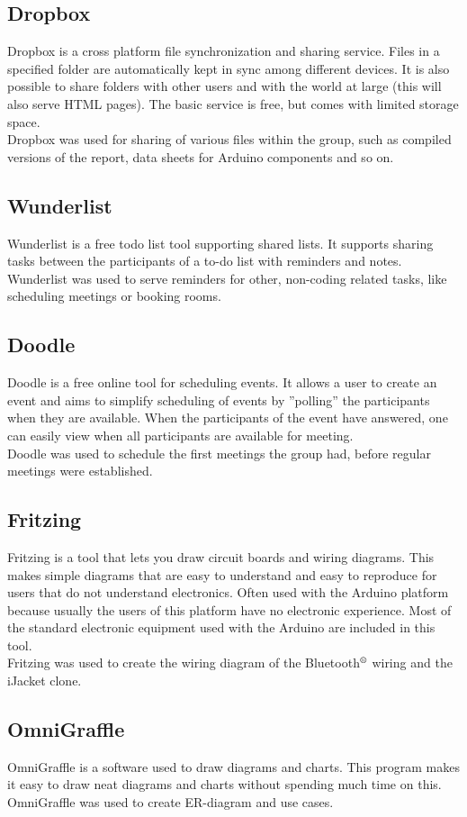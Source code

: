 \subsection{Dropbox}
Dropbox is a cross platform file synchronization and sharing service. Files in a specified folder are automatically kept in sync among different devices. It is also possible to share folders with other users and with the world at large (this will also serve HTML pages). The basic service is free, but comes with limited storage space.\\
Dropbox was used for sharing of various files within the group, such as compiled versions of the report, data sheets for Arduino components and so on.

\subsection{Wunderlist}
Wunderlist is a free todo list tool supporting shared lists. It supports sharing tasks between the participants of a to-do list with reminders and notes.\\
Wunderlist was used to serve reminders for other, non-coding related tasks, like scheduling meetings or booking rooms.

\subsection{Doodle}
Doodle is a free online tool for scheduling events. It allows a user to create an event and aims to simplify scheduling of events by ''polling'' the participants when they are available. When the participants of the event have answered, one can easily view when all participants are available for meeting.\\
Doodle was used to schedule the first meetings the group had, before regular meetings were established.

\subsection{Fritzing}
Fritzing is a tool that lets you draw circuit boards and wiring diagrams. This makes simple diagrams that are easy to understand and easy to reproduce for users that do not understand electronics. Often used with the Arduino platform because usually the users of this platform have no electronic experience. Most of the standard electronic equipment used with the Arduino are included in this tool.\\
Fritzing was used to create the wiring diagram of the Bluetooth$\textsuperscript{\textregistered}$ wiring and the iJacket clone.

\subsection{OmniGraffle}
OmniGraffle is a software used to draw diagrams and charts. This program makes it easy to draw neat diagrams and charts without spending much time on this.\\
OmniGraffle was used to create ER-diagram and use cases.
